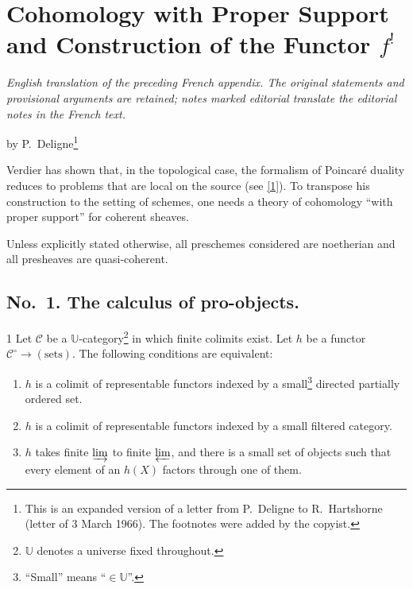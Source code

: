\chapter[English Translation of the Appendix]{Cohomology with Proper Support and Construction of the Functor $f^!$}
\begingroup\setlength{\emergencystretch}{2em}
\noindent\textit{English translation of the preceding French appendix. The original statements and provisional arguments are retained; notes marked editorial translate the editorial notes in the French text.}\par\medskip
by P.\ Deligne\footnote{This is an expanded version of a letter from P.\ Deligne to R.\ Hartshorne (letter of 3 March 1966). The footnotes were added by the copyist.}

Verdier has shown that, in the topological case, the formalism of Poincar\'e duality reduces to problems that are local on the source (see \hyperref[appen:bib1]{[1]}). To transpose his construction to the setting of schemes, one needs a theory of cohomology ``with proper support'' for coherent sheaves.

Unless explicitly stated otherwise, all preschemes considered are noetherian and all presheaves are quasi-coherent.

\section*{No.\ 1. The calculus of pro-objects.}\label{appen:sec1}

\begin{bookproposition}{1}\label{appen:prop1}
Let $\mathcal{C}$ be a $\mathbb{U}$-category\footnote{$\mathbb{U}$ denotes a universe fixed throughout.} in which finite colimits exist. Let $h$ be a functor $\mathcal{C}^{\circ}\to(\text{sets})$. The following conditions are equivalent:
\begin{enumerate}
\item[(i)] $h$ is a colimit of representable functors indexed by a small\footnote{``Small'' means ``$\in\mathbb{U}$''.} directed partially ordered set.
\item[(ii)] $h$ is a colimit of representable functors indexed by a small filtered category.
\item[(iii)] $h$ takes finite $\varinjlim$ to finite $\varprojlim$, and there is a small set of objects such that every element of an $h(X)$ factors through one of them.
\end{enumerate}
\end{bookproposition}


